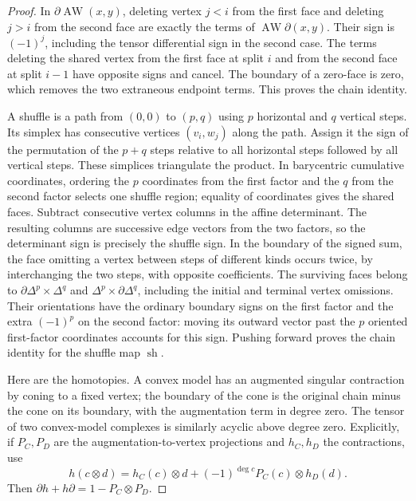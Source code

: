 \documentclass[11pt,oneside,openany]{book}
\theoremstyle{plain}
\theoremstyle{definition}
\theoremstyle{remark}
\begin{document}
\begin{proof}
In \(\partial\operatorname{AW}(x,y)\), deleting vertex \(j<i\)
from the first face and deleting \(j>i\) from the second face
are exactly the terms of \(\operatorname{AW}\partial(x,y)\).
Their sign is \((-1)^j\), including the tensor differential
sign in the second case. The terms deleting the shared vertex
from the first face at split \(i\) and from the second face at
split \(i-1\) have opposite signs and cancel. The boundary of
a zero-face is zero, which removes the two extraneous endpoint
terms. This proves the chain identity.

A shuffle is a path from \((0,0)\) to \((p,q)\) using \(p\)
horizontal and \(q\) vertical steps. Its simplex has consecutive
vertices \((v_i,w_j)\) along the path. Assign it the sign of
the permutation of the \(p+q\) steps relative to all horizontal
steps followed by all vertical steps. These simplices triangulate
the product. In barycentric cumulative coordinates, ordering
the \(p\) coordinates from the first factor and the \(q\) from
the second factor selects one shuffle region; equality of
coordinates gives the shared faces. Subtract consecutive
vertex columns in the affine determinant. The resulting
columns are successive edge vectors from the two factors, so
the determinant sign is precisely the shuffle sign. In the
boundary of the signed sum, the face omitting a vertex between
steps of different kinds occurs twice, by interchanging the
two steps, with opposite coefficients. The surviving faces
belong to \(\partial\Delta^p\times\Delta^q\) and
\(\Delta^p\times\partial\Delta^q\), including the initial
and terminal vertex omissions. Their orientations have the
ordinary boundary signs on the first factor and the extra
\((-1)^p\) on the second factor: moving its outward vector
past the \(p\) oriented first-factor coordinates accounts for
this sign. Pushing forward proves the chain identity for the
shuffle map \(\operatorname{sh}\).

Here are the homotopies. A convex model has an augmented
singular contraction by coning to a fixed vertex; the
boundary of the cone is the original chain minus the cone
on its boundary, with the augmentation term in degree zero.
The tensor of two convex-model complexes is similarly
acyclic above degree zero. Explicitly, if \(P_C,P_D\) are
the augmentation-to-vertex projections and \(h_C,h_D\) the
contractions, use
\[
 h(c\otimes d)=h_C(c)\otimes d+
               (-1)^{\deg c}P_C(c)\otimes h_D(d).
\]
Then \(\partial h+h\partial=1-P_C\otimes P_D\).


\end{proof}
\end{document}
